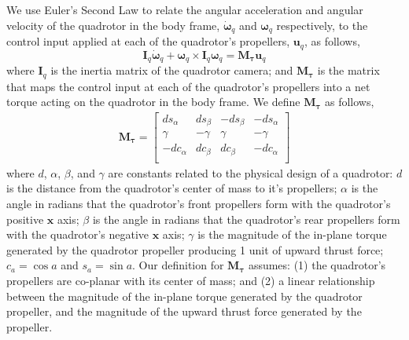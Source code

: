 We use Euler's Second Law to relate the angular acceleration and angular velocity of the quadrotor in the body frame, $\dot{\mathbf{\omega}}_q$ and $\mathbf{\omega}_q$ respectively, to the control input applied at each of the quadrotor's propellers, $\mathbf{u}_q$, as follows,
%
\begin{equation}
\mathbf{I}_{q} \dot{\mathbf{\omega}}_q + \mathbf{\omega}_q \times \mathbf{I}_q \mathbf{\omega}_q = \mathbf{M}_{\mathbf{\tau}} \mathbf{u}_q
\label{eqn:ch2:M_t_u_q_short}
\end{equation}
%
where $\mathbf{I}_{q}$ is the inertia matrix of the quadrotor camera; and $\mathbf{M}_{\mathbf{\tau}}$ is the matrix that maps the control input at each of the quadrotor's propellers into a net torque acting on the quadrotor in the body frame.
We define $\mathbf{M}_{\mathbf{\tau}}$ as follows, 
%
\begin{equation}
\begin{aligned}
%
\mathbf{M}_{\mathbf{\tau}} =
\begin{bmatrix}
 ds_\alpha & ds_\beta & -ds_\beta & -ds_\alpha \\
\gamma     & -\gamma  & \gamma    & -\gamma    \\
-dc_\alpha & dc_\beta & dc_\beta  & -dc_\alpha \\
\end{bmatrix}
%
\end{aligned}
\end{equation}
%
where $d$, $\alpha$, $\beta$, and $\gamma$ are constants related to the physical design of a quadrotor:
$d$ is the distance from the quadrotor's center of mass to it's propellers;
$\alpha$ is the angle in radians that the quadrotor's front propellers form with the quadrotor's positive $\mathbf{x}$ axis;
$\beta$ is the angle in radians that the quadrotor's rear propellers form with the quadrotor's negative $\mathbf{x}$ axis;
$\gamma$ is the magnitude of the in-plane torque generated by the quadrotor propeller producing 1 unit of upward thrust force;
$c_a=\cos a$ and $s_a=\sin a$.
Our definition for $\mathbf{M}_{\mathbf{\tau}}$ assumes: (1) the quadrotor's propellers are co-planar with its center of mass; and (2) a linear relationship between the magnitude of the in-plane torque generated by the quadrotor propeller, and the magnitude of the upward thrust force generated by the propeller. 

